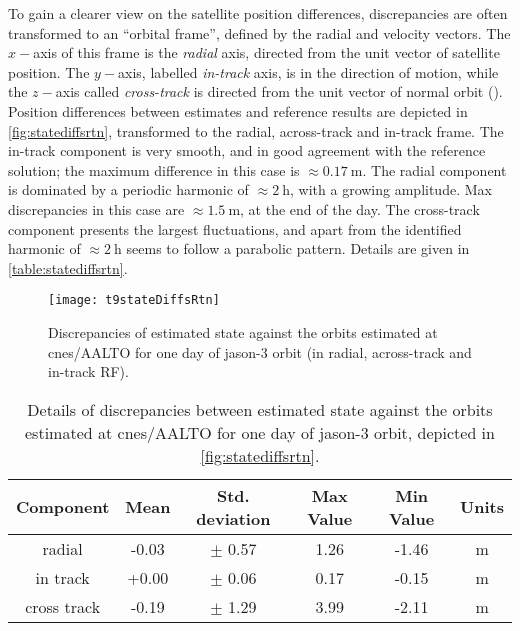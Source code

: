 To gain a clearer view on the satellite position differences, discrepancies are often 
transformed to an ``orbital frame'', defined by the radial and velocity vectors. 
The $x-$axis of this frame is the \emph{radial} axis, directed from the unit vector of 
satellite position. The $y-$axis, labelled \emph{in-track} axis, is in the direction 
of motion, while the $z-$axis called \emph{cross-track} is directed from the unit 
vector of normal orbit (\cite{Eunhyouek2019}). Position differences between estimates and 
reference results are depicted in \autoref{fig:statediffsrtn}, transformed to the radial, 
across-track and in-track frame. The in-track component is very smooth, and in good 
agreement with the reference solution; the maximum difference in this case is 
$\approx \SI{0.17}{\meter}$. The radial component is dominated by a periodic harmonic of 
$\approx \SI{2}{\hour}$, with a growing amplitude. Max discrepancies in this case are 
$\approx \SI{1.5}{\meter}$, at the end of the day. The cross-track component presents the 
largest fluctuations, and apart from the identified harmonic of $\approx \SI{2}{\hour}$ 
seems to follow a parabolic pattern. Details are given in \autoref{table:statediffsrtn}.
\begin{figure}[h]
    \centering
    \texttt{[image: t9stateDiffsRtn]}
    \caption{Discrepancies of estimated state against the orbits estimated at \gls{cnes}/AALTO for one day of \gls{jason}-3 orbit (in radial, across-track and in-track RF).}
    \label{fig:statediffsrtn}
\end{figure}

\begin{table}[h!]
    \centering
    \begin{tabularx}{\textwidth}{cccccc}
        \toprule
        \textbf{Component} & \textbf{Mean} & \textbf{Std. deviation} & \textbf{Max Value} & \textbf{Min Value} & \textbf{Units}\\
        \hline
        radial &  -0.03 & $\pm$ 0.57 & 1.26 & -1.46 & \si{\metre}\\
        in track &  +0.00 & $\pm$ 0.06 & 0.17 & -0.15 & \si{\metre}\\
        cross track &  -0.19 & $\pm$ 1.29 & 3.99 & -2.11 & \si{\metre}\\
       \bottomrule
    \end{tabularx}
    \caption{Details of discrepancies between estimated state against the orbits estimated at \gls{cnes}/AALTO for one day of \gls{jason}-3 orbit, depicted in \autoref{fig:statediffsrtn}.}
    \label{table:statediffsrtn}
\end{table}


